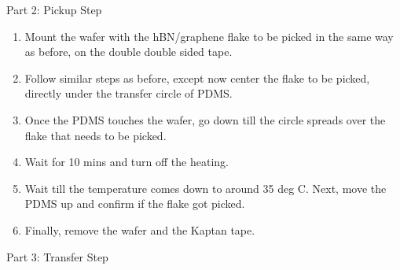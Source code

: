 Part 2: Pickup Step
\begin{enumerate}
\item Mount the wafer with the hBN/graphene flake to be picked in the same way as before, on the double double sided tape.
\item Follow similar steps as before, except now center the flake to be picked, directly under the transfer circle of PDMS.
\item Once the PDMS touches the wafer, go down till the circle spreads over the flake that needs to be picked.
\item Wait for 10 mins and turn off the heating.
\item Wait till the temperature comes down to around 35 deg C. Next, move the PDMS up and confirm if the flake got picked.
\item Finally, remove the wafer and the Kaptan tape.
\end{enumerate}

Part 3: Transfer Step

